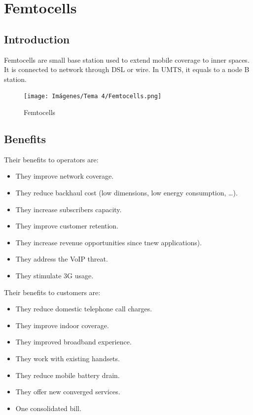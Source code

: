 \documentclass[
	12pt,
	twoside
]{book}
\begin{document}
\section{Femtocells}

\subsection{Introduction}

Femtocells are small base station used to extend mobile coverage to inner spaces. It is connected to network through DSL or wire. In UMTS, it equals to a node B station.

\begin{figure}[H]
	\centering
	\texttt{[image: Imágenes/Tema 4/Femtocells.png]}
	\caption{
		\label{fig:unit4_Femtocells}
		Femtocells
	}
\end{figure}

\subsection{Benefits}

Their benefits to operators are:
\begin{itemize}
	\item They improve network coverage.
	\item They reduce backhaul cost (low dimensions, low energy consumption, \ldots).
	\item They increase subscribers capacity.
	\item They improve customer retention.
	\item They increase revenue opportunities since tnew applications).
	\item They address the VoIP threat.
	\item They stimulate 3G usage.
\end{itemize}

Their benefits to customers are:
\begin{itemize}
	\item They reduce domestic telephone call charges.
	\item They improve indoor coverage.
	\item They improved broadband experience.
	\item They work with existing handsets.
	\item They reduce mobile battery drain.
	\item They offer new converged services.
	\item One consolidated bill.
\end{itemize}
\end{document}
